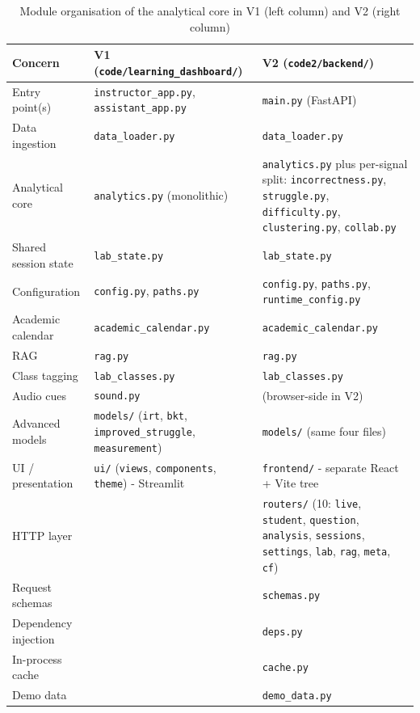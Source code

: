 \begin{table}[H]
    \centering
    \begin{tabular}{|p{}|p{}|p{}|}
    \hline
    \textbf{Concern} & \textbf{V1 (\texttt{code/learning\_dashboard/})} & \textbf{V2 (\texttt{code2/backend/})} \\
    \hline
    \hline
    Entry point(s) & \texttt{instructor\_app.py}, \texttt{assistant\_app.py} & \texttt{main.py} (FastAPI) \\
    \hline
    Data ingestion & \texttt{data\_loader.py} & \texttt{data\_loader.py} \\
    \hline
    Analytical core & \texttt{analytics.py} (monolithic) & \texttt{analytics.py} plus per-signal split: \texttt{incorrectness.py}, \texttt{struggle.py}, \texttt{difficulty.py}, \texttt{clustering.py}, \texttt{collab.py} \\
    \hline
    Shared session state & \texttt{lab\_state.py} & \texttt{lab\_state.py} \\
    \hline
    Configuration & \texttt{config.py}, \texttt{paths.py} & \texttt{config.py}, \texttt{paths.py}, \texttt{runtime\_config.py} \\
    \hline
    Academic calendar & \texttt{academic\_calendar.py} & \texttt{academic\_calendar.py} \\
    \hline
    RAG & \texttt{rag.py} & \texttt{rag.py} \\
    \hline
    Class tagging & \texttt{lab\_classes.py} & \texttt{lab\_classes.py} \\
    \hline
    Audio cues & \texttt{sound.py} &  (browser-side in V2) \\
    \hline
    Advanced models & \texttt{models/} (\texttt{irt}, \texttt{bkt}, \texttt{improved\_struggle}, \texttt{measurement}) & \texttt{models/} (same four files) \\
    \hline
    UI / presentation & \texttt{ui/} (\texttt{views}, \texttt{components}, \texttt{theme}) - Streamlit & \texttt{frontend/} - separate React + Vite tree \\
    \hline
    HTTP layer & & \texttt{routers/} (10: \texttt{live}, \texttt{student}, \texttt{question}, \texttt{analysis}, \texttt{sessions}, \texttt{settings}, \texttt{lab}, \texttt{rag}, \texttt{meta}, \texttt{cf}) \\
    \hline
    Request schemas &  & \texttt{schemas.py} \\
    \hline
    Dependency injection & & \texttt{deps.py} \\
    \hline
    In-process cache &  & \texttt{cache.py} \\
    \hline
    Demo data & & \texttt{demo\_data.py} \\
    \hline
    \end{tabular}
    \caption{Module organisation of the analytical core in V1 (left column) and V2 (right column)}
    \label{tab:pkg-structure}
\end{table}

